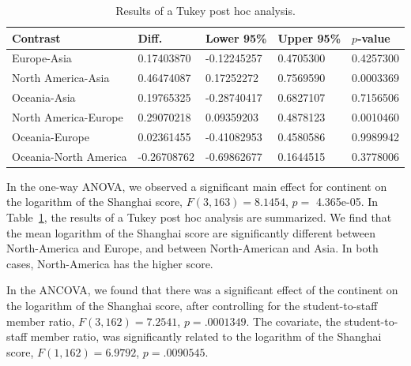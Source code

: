 \documentclass{stats_apa_style2}
\begin{document}
\begin{table}
\centering
\begin{tabular}{lllll}
\hline
Contrast & Diff.    & Lower 95\% & Upper 95\% &   $p$-value \\
\hline
Europe-Asia          &  0.17403870 &-0.12245257 &0.4705300 &0.4257300 \\
North America-Asia   &  0.46474087 & 0.17252272 &0.7569590 &0.0003369 \\
Oceania-Asia         &  0.19765325 &-0.28740417 &0.6827107 &0.7156506 \\
North America-Europe &  0.29070218 & 0.09359203 &0.4878123 &0.0010460 \\
Oceania-Europe        & 0.02361455 &-0.41082953 &0.4580586 &0.9989942 \\
Oceania-North America &-0.26708762 &-0.69862677 &0.1644515 &0.3778006 \\
\hline		
\end{tabular}
\caption{Results of a Tukey post hoc analysis.}
\label{table:tukey}
\end{table}        

In the one-way ANOVA, we observed a significant main effect for continent on the
logarithm of the Shanghai score, $F(3, 163) = 8.1454$, $p =$ 4.365e-05. In
Table~\ref{table:tukey}, the results of a Tukey post hoc analysis are
summarized. We find that the mean logarithm of the Shanghai score are
significantly different between North-America and Europe, and between
North-American and Asia. In both cases, North-America has the higher score.

In the ANCOVA, we found that there was a significant effect of the continent on
the logarithm of the Shanghai score, after controlling for the
student-to-staff member ratio, $F(3, 162)  = 7.2541 $, $p = .0001349$. The
covariate, the student-to-staff member ratio, was significantly related to the
logarithm of the Shanghai score, $F(1, 162)  = 6.9792  $, $p = .0090545 $.
\end{document}
